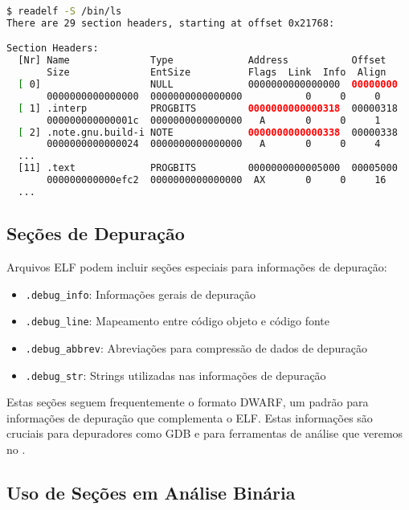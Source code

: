 \begin{lstlisting}[language=bash, caption={Exemplo de uso do readelf para analisar seções}, label={lst:readelf_sections}]
$ readelf -S /bin/ls
There are 29 section headers, starting at offset 0x21768:

Section Headers:
  [Nr] Name              Type             Address           Offset
       Size              EntSize          Flags  Link  Info  Align
  [ 0]                   NULL             0000000000000000  00000000
       0000000000000000  0000000000000000           0     0     0
  [ 1] .interp           PROGBITS         0000000000000318  00000318
       000000000000001c  0000000000000000   A       0     0     1
  [ 2] .note.gnu.build-i NOTE             0000000000000338  00000338
       0000000000000024  0000000000000000   A       0     0     4
  ...
  [11] .text             PROGBITS         0000000000005000  00005000
       000000000000efc2  0000000000000000  AX       0     0     16
  ...
\end{lstlisting}

\subsection{Seções de Depuração}\label{subsec:debug_sections}

Arquivos ELF podem incluir seções especiais para informações de depuração:

\begin{itemize}
    \item \texttt{.debug\_info}: Informações gerais de depuração
    \item \texttt{.debug\_line}: Mapeamento entre código objeto e código fonte
    \item \texttt{.debug\_abbrev}: Abreviações para compressão de dados de depuração
    \item \texttt{.debug\_str}: Strings utilizadas nas informações de depuração
\end{itemize}

Estas seções seguem frequentemente o formato DWARF, um padrão para informações de depuração que complementa o ELF. Estas informações são cruciais para depuradores como GDB e para ferramentas de análise que veremos no .

\subsection{Uso de Seções em Análise Binária}\label{subsec:section_binary_analysis}

